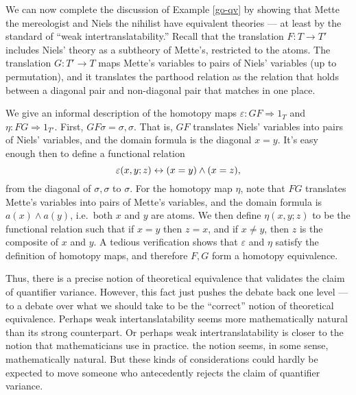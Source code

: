 \begin{example} \label{ex:nihil} We can now complete the discussion of
  Example \ref{go-qv} by showing that Mette the mereologist and Niels
  the nihilist have equivalent theories --- at least by the standard
  of ``weak intertranslatability.''  Recall that the translation
  $F:T\to T'$ includes Niels' theory as a subtheory of Mette's,
  restricted to the atoms.  The translation $G:T'\to T$ maps Mette's
  variables to pairs of Niels' variables (up to permutation), and it
  translates the parthood relation as the relation that holds between
  a diagonal pair and non-diagonal pair that matches in one
  place.

  We give an informal description of the homotopy maps
  $\varepsilon :GF\Rightarrow 1_T$ and $\eta :FG\Rightarrow 1_{T'}$.
  First, $GF\sigma = \sigma ,\sigma$.  That is, $GF$ translates Niels'
  variables into pairs of Niels' variables, and the domain formula is
  the diagonal $x=y$.  It's easy enough then to define a functional
  relation
  \[ \varepsilon (x,y;z) \leftrightarrow (x=y)\wedge (x=z) ,\] from the diagonal
  of $\sigma,\sigma$ to $\sigma$.  For the homotopy map $\eta$, note
  that $FG$ translates Mette's variables into pairs of Mette's
  variables, and the domain formula is $a(x)\wedge a(y)$, i.e.\ both
  $x$ and $y$ are atoms.  We then define $\eta (x,y;z)$ to be the
  functional relation such that if $x=y$ then $z=x$, and if $x\neq y$,
  then $z$ is the composite of $x$ and $y$.  A tedious verification
  shows that $\varepsilon$ and $\eta$ satisfy the definition of
  homotopy maps, and therefore $F,G$ form a homotopy
  equivalence.

  Thus, there is a precise notion of theoretical equivalence that
  validates the claim of quantifier variance.  However, this fact just
  pushes the debate back one level --- to a debate over what we should
  take to be the ``correct'' notion of theoretical equivalence.
  Perhaps weak intertanslatability seems more mathematically natural
  than its strong counterpart.  Or perhaps weak intertranslatability
  is closer to the notion that mathematicians use in practice.  the
  notion seems, in some sense, mathematically natural.  But these
  kinds of considerations could hardly be expected to move someone who
  antecedently rejects the claim of quantifier variance. \end{example}


